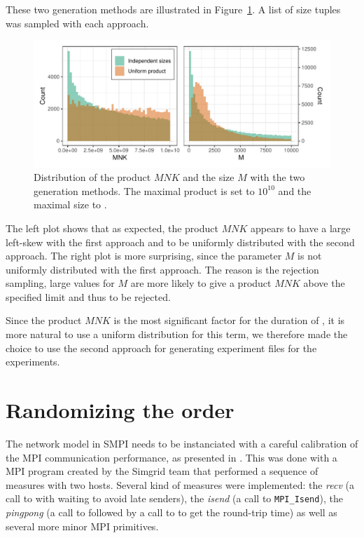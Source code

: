             These two generation methods are illustrated in Figure~\ref{fig:parameter_space}. A list of 
            size tuples was sampled with each approach.

            \begin{figure}[htpb]
                \centering
                \includegraphics[width=\linewidth]{img/experiment/parameter_space/distribution.pdf}
                \caption{Distribution of the product \(MNK\) and the size \(M\) with the two generation methods. The
                maximal product is set to \(10^{10}\) and the maximal size to .}%
                \label{fig:parameter_space}
            \end{figure}

            The left plot shows that as expected, the product \(MNK\) appears to have a large left-skew with the first
            approach and to be uniformly distributed with the second approach. The right plot is more surprising, since
            the parameter \(M\) is not uniformly distributed with the first approach. The reason is the rejection
            sampling, large values for \(M\) are more likely to give a product \(MNK\) above the specified limit and
            thus to be rejected.

            Since the product \(MNK\) is the most significant factor for the duration of \dgemm, it is more natural to
            use a uniform distribution for this term, we therefore made the choice to use the second approach for
            generating experiment files for the \dgemm experiments.

    \section{Randomizing the order}%
    \label{sec:randomizing_order}
        The network model in SMPI needs to be instanciated with a careful calibration of the MPI communication
        performance, as presented in \cite{smpi}. This was done with a MPI program created by the Simgrid team that
        performed a sequence of measures with two hosts. Several kind of measures were implemented: the \emph{recv}
        (a call to \recv with waiting to avoid late senders), the \emph{isend} (a call to
        \texttt{MPI\_Isend}), the \emph{pingpong} (a call to \send followed by a call to \recv
        to get the round-trip time) as well as several more minor MPI primitives.

